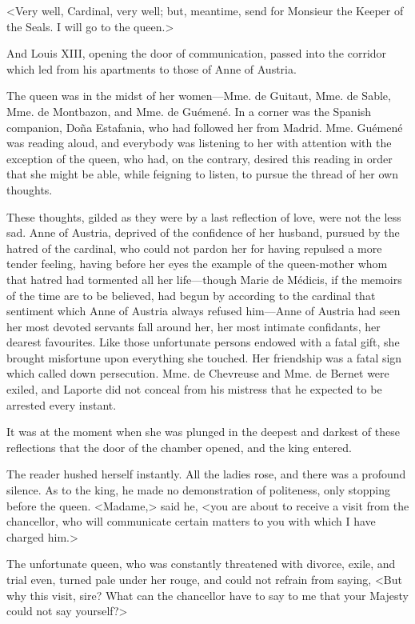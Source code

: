 <Very well, Cardinal, very well; but, meantime, send for Monsieur the Keeper of the Seals. I will go to the queen.> 

And Louis XIII, opening the door of communication, passed into the corridor which led from his apartments to those of Anne of Austria. 

The queen was in the midst of her women---Mme. de Guitaut, Mme. de Sable, Mme. de Montbazon, and Mme. de Guémené. In a corner was the Spanish companion, Doña Estafania, who had followed her from Madrid. Mme. Guémené was reading aloud, and everybody was listening to her with attention with the exception of the queen, who had, on the contrary, desired this reading in order that she might be able, while feigning to listen, to pursue the thread of her own thoughts. 

These thoughts, gilded as they were by a last reflection of love, were not the less sad. Anne of Austria, deprived of the confidence of her husband, pursued by the hatred of the cardinal, who could not pardon her for having repulsed a more tender feeling, having before her eyes the example of the queen-mother whom that hatred had tormented all her life---though Marie de Médicis, if the memoirs of the time are to be believed, had begun by according to the cardinal that sentiment which Anne of Austria always refused him---Anne of Austria had seen her most devoted servants fall around her, her most intimate confidants, her dearest favourites. Like those unfortunate persons endowed with a fatal gift, she brought misfortune upon everything she touched. Her friendship was a fatal sign which called down persecution. Mme. de Chevreuse and Mme. de Bernet were exiled, and Laporte did not conceal from his mistress that he expected to be arrested every instant. 

It was at the moment when she was plunged in the deepest and darkest of these reflections that the door of the chamber opened, and the king entered. 

The reader hushed herself instantly. All the ladies rose, and there was a profound silence. As to the king, he made no demonstration of politeness, only stopping before the queen. <Madame,> said he, <you are about to receive a visit from the chancellor, who will communicate certain matters to you with which I have charged him.> 

The unfortunate queen, who was constantly threatened with divorce, exile, and trial even, turned pale under her rouge, and could not refrain from saying, <But why this visit, sire? What can the chancellor have to say to me that your Majesty could not say yourself?> 

